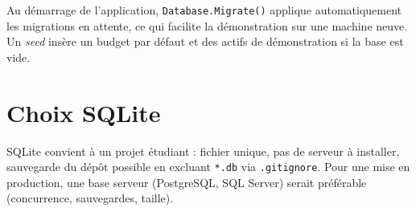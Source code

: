 Au démarrage de l'application, \texttt{Database.Migrate()} applique automatiquement les migrations en attente, ce qui facilite la démonstration sur une machine neuve. Un \emph{seed} insère un budget par défaut et des actifs de démonstration si la base est vide.

\section{Choix SQLite}

SQLite convient à un projet étudiant : fichier unique, pas de serveur à installer, sauvegarde du dépôt possible en excluant \texttt{*.db} via \texttt{.gitignore}. Pour une mise en production, une base serveur (PostgreSQL, SQL Server) serait préférable (concurrence, sauvegardes, taille).
